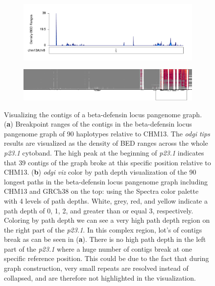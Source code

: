 \begin{figure}[ht!]
	\begin{subfigure}{\linewidth}
		\caption{}
		\centering
		\includegraphics[width=1.0\linewidth, trim=0cm 2cm 0cm 2cm]{fig/tips/chr8_chm13_beta_defensin_locus_odgi_tips_w50000_karyoploteR}
		\label{fig:tips-karyo}
	\end{subfigure}
	\begin{subfigure}{\linewidth}
	\caption{}
	\centering
	\includegraphics[width=1.0\linewidth, trim=-10cm 6cm -3.4cm 3cm]{fig/tips/chr8_pan_fa_c3d3224_7748b33.395c7f4_smooth_og_Y_og_p23_1_og_90paths_m}
	\label{fig:tips-viz}
\end{subfigure}
	\caption{Visualizing the contigs of a beta-defensin locus pangenome graph. (\textbf{a}) Breakpoint ranges of the contigs in the beta-defensin locus pangenome graph of 90 haplotypes relative to CHM13. The \textit{odgi tips} results are visualized as the density of BED ranges across the whole \textit{p23.1} cytoband. The high peak at the beginning of \textit{p23.1} indicates that 39 contigs of the graph broke at this specific position relative to CHM13. (\textbf{b}) \textit{odgi viz} color by path depth visualization of the 90 longest paths in the beta-defensin locus pangenome graph including CHM13 and GRCh38 on the top: using the Spectra color palette with 4 levels of path depths. White, grey, red, and yellow indicate a path depth of 0, 1, 2, and greater than or equal 3, respectively. Coloring by path depth we can see a very high path depth region on the right part of the  \textit{p23.1}. In this complex region, lot's of contigs break as can be seen in (\textbf{a}). There is no high path depth in the left part of the \textit{p23.1} where a huge number of contigs break at one specific reference position. This could be due to the fact that during graph construction, very small repeats are resolved instead of collapsed, and are therefore not highlighted in the visualization.}
	\label{fig:tips}
\end{figure}

